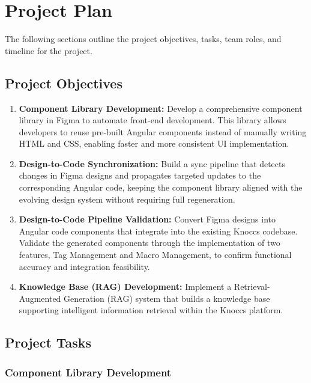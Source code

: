 \section{Project Plan}

The following sections outline the project objectives, tasks, team roles, and timeline for the project.

\subsection{Project Objectives}

\begin{enumerate}
    \item \textbf{Component Library Development:} Develop a comprehensive component library in Figma to automate front-end development. This library allows developers to reuse pre-built Angular components instead of manually writing HTML and CSS, enabling faster and more consistent UI implementation.

    \item \textbf{Design-to-Code Synchronization:} Build a sync pipeline that detects changes in Figma designs and propagates targeted updates to the corresponding Angular code, keeping the component library aligned with the evolving design system without requiring full regeneration.

    \item \textbf{Design-to-Code Pipeline Validation:} Convert Figma designs into Angular code components that integrate into the existing Knoccs codebase. Validate the generated components through the implementation of two features, Tag Management and Macro Management, to confirm functional accuracy and integration feasibility.

    \item \textbf{Knowledge Base (RAG) Development:} Implement a Retrieval-Augmented Generation (RAG) system that builds a knowledge base supporting intelligent information retrieval within the Knoccs platform.
\end{enumerate}

\subsection{Project Tasks}

\subsubsection{Component Library Development}


